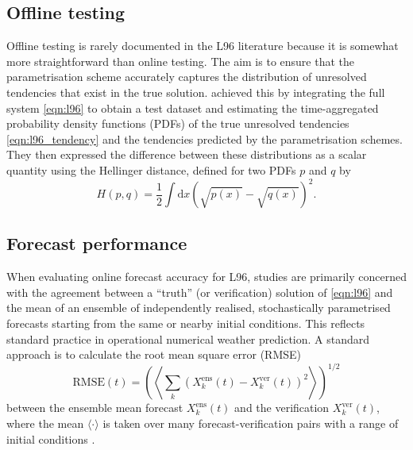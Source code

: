 \documentclass[../main.tex]{subfiles}
\begin{document}
\subsection{Offline testing}
Offline testing is rarely documented in the L96 literature because it is
somewhat more straightforward than online testing. The aim is to ensure that
the parametrisation scheme accurately captures the distribution of unresolved
tendencies that exist in the true solution. \textcite{gagne2020} achieved this
by integrating the full system \cref{eqn:l96} to obtain a test dataset and
estimating the time-aggregated probability density functions (PDFs) of the true
unresolved tendencies \cref{eqn:l96_tendency} and the tendencies predicted by
the parametrisation schemes. They then expressed the difference between these
distributions as a scalar quantity using the Hellinger distance, defined for
two PDFs $p$ and $q$ by
\begin{equation} \label{eqn:hellinger}
    H(p,q) = \frac{1}{2} \int \mathrm{d}x
        \left( \sqrt{p(x)} - \sqrt{q(x)} \right)^2.
\end{equation}

\subsection{Forecast performance}
When evaluating online forecast accuracy for L96, studies are primarily
concerned with the agreement between a ``truth'' (or verification) solution of
\cref{eqn:l96} and the mean of an ensemble of independently realised,
stochastically parametrised forecasts starting from the same or nearby initial
conditions. This reflects standard practice in operational numerical weather
prediction. A standard approach is to calculate the root mean square error
(RMSE)
\begin{equation*}
    \mathrm{RMSE}(t) = \left( \left\langle
        \sum_k (X_k^\text{ens}(t) - X_k^\text{ver}(t))^2
    \right\rangle \right)^{1/2}
\end{equation*}
between the ensemble mean forecast $X_k^\text{ens}(t)$ and the verification
$X_k^\text{ver}(t)$, where the mean $\langle \cdot \rangle$ is taken over many
forecast-verification pairs with a range of initial conditions
\parencite{crommelin2008,gagne2020}.
\end{document}
